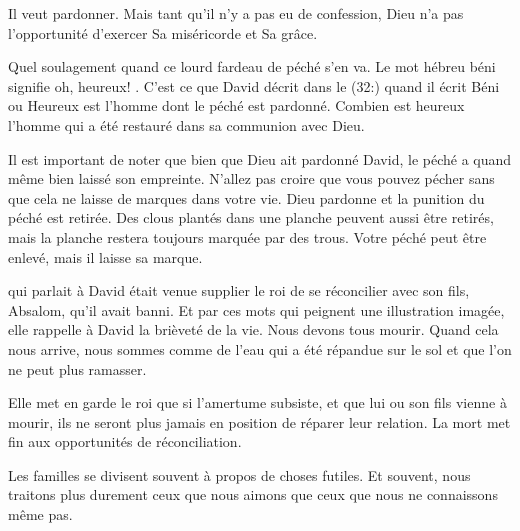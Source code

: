 Il veut pardonner.
 Mais tant qu'il n'y a pas eu de confession,
 Dieu n'a pas l'opportunité d'exercer Sa miséricorde et Sa grâce. 

Quel soulagement quand ce lourd fardeau de péché s'en va.
 Le mot hébreu \og béni \fg{} signifie \og oh, heureux! \fg{}.
 C'est ce que David décrit dans le (32:)
 quand il écrit \og Béni \fg{} ou \og Heureux \fg{} est l'homme
 dont le péché est pardonné.
 Combien est heureux l'homme qui a été restauré
 dans sa communion avec Dieu. 

Il est important de noter que bien que Dieu ait pardonné David,
 le péché a quand même bien laissé son empreinte.
 N'allez pas croire que vous pouvez pécher sans que cela ne laisse
 de marques dans votre vie.
 Dieu pardonne et la punition du péché est retirée.
 Des clous plantés dans une planche peuvent aussi être retirés,
 mais la planche restera toujours marquée par des trous.
 Votre péché peut être enlevé, mais il laisse sa marque. 

\dvrule







 qui parlait à David était venue supplier
 le roi de se réconcilier avec son fils, Absalom, qu'il avait banni.
 Et par ces mots qui peignent une illustration imagée, elle rappelle à David
 la brièveté de la vie. Nous devons tous mourir.
 Quand cela nous arrive, nous sommes comme de l'eau qui a été répandue
 sur le sol et que l'on ne peut plus ramasser. 

Elle met en garde le roi que si l'amertume subsiste, et que lui ou son fils
 vienne à mourir, ils ne seront plus jamais en position
 de réparer leur relation.
 La mort met fin aux opportunités de réconciliation. 

Les familles se divisent souvent à propos de choses futiles.
 Et souvent, nous traitons plus durement ceux que nous aimons
 que ceux que nous ne connaissons même pas. 

